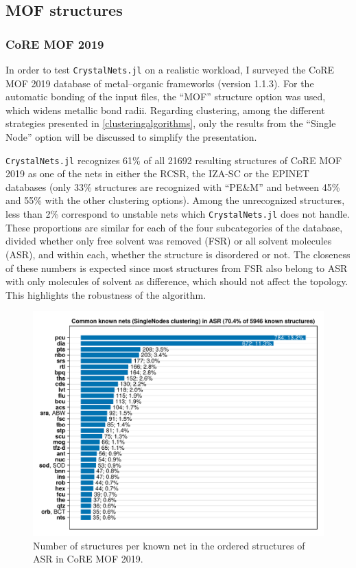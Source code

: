 \documentclass[main.tex]{subfiles}
\begin{document}


\subsection{MOF structures}

\subsubsection{CoRE MOF 2019}

In order to test \texttt{CrystalNets.jl} on a realistic workload, I surveyed the CoRE MOF 2019 \autocite{CoREMOF} database of metal--organic frameworks (version 1.1.3). For the automatic bonding of the input files, the ``MOF'' structure option was used, which widens metallic bond radii. Regarding clustering, among the different strategies presented in \cref{clusteringalgorithms}, only the results from the ``Single Node'' option will be discussed to simplify the presentation.

\texttt{CrystalNets.jl} recognizes {61\%} of all \num{21692} resulting structures of CoRE MOF 2019 as one of the nets in either the RCSR, the IZA-SC or the EPINET databases (only {33\%} structures are recognized with ``PE\&M'' and between {45\%} and {55\%} with the other clustering options). Among the unrecognized structures, less than {2\%} correspond to unstable nets which \texttt{CrystalNets.jl} does not handle.
These proportions are similar for each of the four subcategories of the database, divided whether only free solvent was removed (FSR) or all solvent molecules (ASR), and within each, whether the structure is disordered or not. The closeness of these numbers is expected since most structures from FSR also belong to ASR with only molecules of solvent as difference, which should not affect the topology. This highlights the robustness of the algorithm.

\begin{figure}
	\centering
	\includegraphics[width=\linewidth]{figures/topology/CoREMOF2019.pdf}
	\caption{Number of structures per known net in the ordered structures of ASR in CoRE MOF 2019\autocite{CoREMOF}.}
	\label{numstructpernet}
\end{figure}
\end{document}

